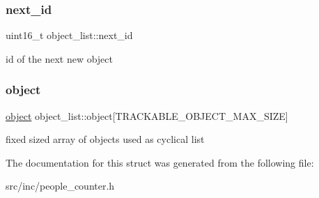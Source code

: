 \subsubsection{\texorpdfstring{next\_id}{next\_id}}
{\footnotesize\ttfamily uint16\+\_\+t object\+\_\+list\+::next\+\_\+id}

id of the next new object \mbox{\label{structobject__list_abcc549bdb02204da143d2efdd675861d}} 
\subsubsection{\texorpdfstring{object}{object}}
{\footnotesize\ttfamily \mbox{\hyperlink{structobject}{object}} object\+\_\+list\+::object\mbox{[}T\+R\+A\+C\+K\+A\+B\+L\+E\+\_\+\+O\+B\+J\+E\+C\+T\+\_\+\+M\+A\+X\+\_\+\+S\+I\+ZE\mbox{]}}

fixed sized array of objects used as cyclical list 

The documentation for this struct was generated from the following file\+:\begin{DoxyCompactItemize}
\item 
src/inc/people\+\_\+counter.\+h\end{DoxyCompactItemize}
